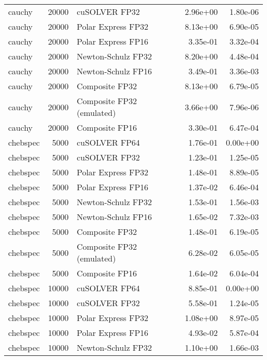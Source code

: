 \begin{table}
\begin{tabular}{lrlrr}
   cauchy & 20000 &             cuSOLVER FP32 &  2.96e+00 &        1.80e-06 \\
   cauchy & 20000 &        Polar Express FP32 &  8.13e+00 &        6.90e-05 \\
   cauchy & 20000 &        Polar Express FP16 &  3.35e-01 &        3.32e-04 \\
   cauchy & 20000 &        Newton-Schulz FP32 &  8.20e+00 &        4.48e-04 \\
   cauchy & 20000 &        Newton-Schulz FP16 &  3.49e-01 &        3.36e-03 \\
   cauchy & 20000 &            Composite FP32 &  8.13e+00 &        6.79e-05 \\
   cauchy & 20000 & Composite FP32 (emulated) &  3.66e+00 &        7.96e-06 \\
   cauchy & 20000 &            Composite FP16 &  3.30e-01 &        6.47e-04 \\
 chebspec &  5000 &             cuSOLVER FP64 &  1.76e-01 &        0.00e+00 \\
 chebspec &  5000 &             cuSOLVER FP32 &  1.23e-01 &        1.25e-05 \\
 chebspec &  5000 &        Polar Express FP32 &  1.48e-01 &        8.89e-05 \\
 chebspec &  5000 &        Polar Express FP16 &  1.37e-02 &        6.46e-04 \\
 chebspec &  5000 &        Newton-Schulz FP32 &  1.53e-01 &        1.56e-03 \\
 chebspec &  5000 &        Newton-Schulz FP16 &  1.65e-02 &        7.32e-03 \\
 chebspec &  5000 &            Composite FP32 &  1.48e-01 &        6.19e-05 \\
 chebspec &  5000 & Composite FP32 (emulated) &  6.28e-02 &        6.05e-05 \\
 chebspec &  5000 &            Composite FP16 &  1.64e-02 &        6.04e-04 \\
 chebspec & 10000 &             cuSOLVER FP64 &  8.85e-01 &        0.00e+00 \\
 chebspec & 10000 &             cuSOLVER FP32 &  5.58e-01 &        1.24e-05 \\
 chebspec & 10000 &        Polar Express FP32 &  1.08e+00 &        8.97e-05 \\
 chebspec & 10000 &        Polar Express FP16 &  4.93e-02 &        5.87e-04 \\
 chebspec & 10000 &        Newton-Schulz FP32 &  1.10e+00 &        1.66e-03 \\

\end{tabular}
\end{table}
